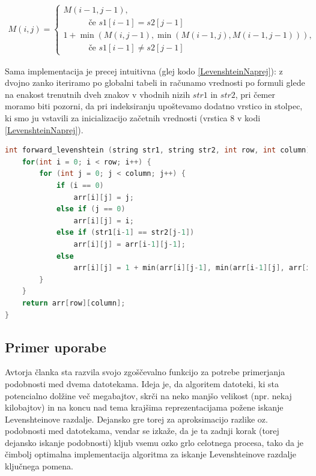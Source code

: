 \documentclass[a4paper,12pt,openright]{book}
\begin{document}
\bigskip \bigskip

\begin{equation}
\label{LevenshteinEquation}
\begin{aligned}
M(i, j) =
\begin{cases}
     M(i-1, j-1) ,     \\ \quad \quad \quad \text{če } s1[i-1]=s2[j-1]\\
     1 + \min(M(i, j-1), \min(M(i-1, j), M(i-1, j-1))) , \\ \quad \quad \quad \text{če } s1[i-1] \neq s2[j-1]
  \end{cases}
\end{aligned}
\end{equation}

\bigskip \bigskip

Sama implementacija je precej intuitivna (glej kodo \ref{LevenshteinNaprej}): z dvojno zanko iteriramo po globalni tabeli in računamo vrednosti po formuli glede na enakost trenutnih dveh znakov v vhodnih nizih $str1$ in $str2$, pri čemer moramo biti pozorni, da pri indeksiranju upoštevamo dodatno vrstico in stolpec, ki smo ju vstavili za inicializacijo začetnih vrednosti (vrstica 8 v kodi \ref{LevenshteinNaprej}). \bigskip \bigskip

\begin{lstlisting}[language=C++, caption={Algoritem za izračun Levenshteinove razdalje}, captionpos=b, label=LevenshteinNaprej]
int forward_levenshtein (string str1, string str2, int row, int column) {
    for(int i = 0; i < row; i++) {
        for (int j = 0; j < column; j++) {    
            if (i == 0)
                arr[i][j] = j;
            else if (j == 0)
                arr[i][j] = i;
            else if (str1[i-1] == str2[j-1])
                arr[i][j] = arr[i-1][j-1];
            else 
                arr[i][j] = 1 + min(arr[i][j-1], min(arr[i-1][j], arr[i-1][j-1]));
        }
    }
    return arr[row][column];
}
\end{lstlisting}

\subsection{Primer uporabe}

Avtorja članka \cite{documentsimilarity} sta razvila svojo zgoščevalno funkcijo za potrebe primerjanja podobnosti med dvema datotekama. Ideja je, da algoritem datoteki, ki sta potencialno dolžine več megabajtov, skrči na neko manjšo velikost (npr. nekaj kilobajtov) in na koncu nad tema krajšima reprezentacijama požene iskanje Levenshteinove razdalje. Dejansko gre torej za aproksimacijo razlike oz. podobnosti med datotekama, vendar se izkaže, da je ta zadnji korak (torej dejansko iskanje podobnosti) kljub vsemu ozko grlo celotnega procesa, tako da je čimbolj optimalna implementacija algoritma za iskanje Levenshteinove razdalje ključnega pomena. 
\end{document}
